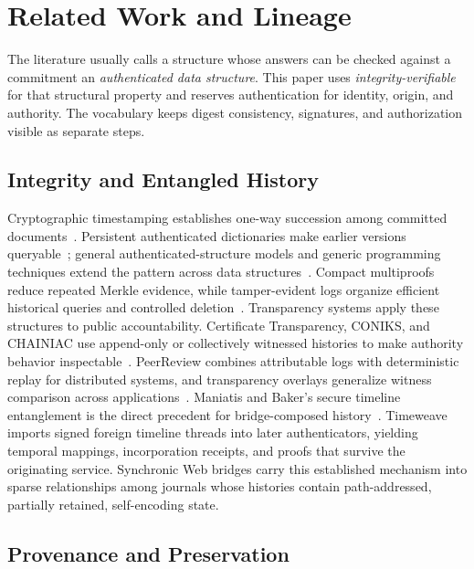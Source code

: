 \section{Related Work and Lineage}
\label{sec:related-work}

The literature usually calls a structure whose answers can be checked against a commitment an \emph{authenticated data structure}. This paper uses \emph{integrity-verifiable} for that structural property and reserves authentication for identity, origin, and authority. The vocabulary keeps digest consistency, signatures, and authorization visible as separate steps.

\subsection{Integrity and Entangled History}

Cryptographic timestamping establishes one-way succession among committed documents~\cite{Haber1991timestamp}. Persistent authenticated dictionaries make earlier versions queryable~\cite{Anagnostopoulos2001persistent}; general authenticated-structure models and generic programming techniques extend the pattern across data structures~\cite{Martel2004general,Miller2014authenticated}. Compact multiproofs reduce repeated Merkle evidence, while tamper-evident logs organize efficient historical queries and controlled deletion~\cite{Ramabaja2020compact,Crosby2009efficient}. Transparency systems apply these structures to public accountability. Certificate Transparency, CONIKS, and CHAINIAC use append-only or collectively witnessed histories to make authority behavior inspectable~\cite{Laurie2014certificate,Melara2015coniks,Nikitin2017chainiac}. PeerReview combines attributable logs with deterministic replay for distributed systems, and transparency overlays generalize witness comparison across applications~\cite{Haeberlen2007peerreview,Chase2016transparency}. Maniatis and Baker's secure timeline entanglement is the direct precedent for bridge-composed history~\cite{Maniatis2002timeline}. Timeweave imports signed foreign timeline threads into later authenticators, yielding temporal mappings, incorporation receipts, and proofs that survive the originating service. Synchronic Web bridges carry this established mechanism into sparse relationships among journals whose histories contain path-addressed, partially retained, self-encoding state.

\subsection{Provenance and Preservation}

